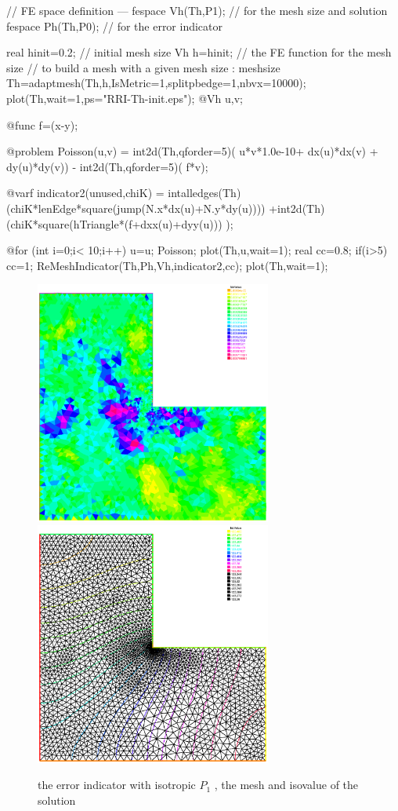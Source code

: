 \documentclass[a4paper,twoside,12pt]{book}
\begin{document}
\begin{example}
\bFF
// FE space definition ---
fespace Vh(Th,P1); // for the mesh size and solution
fespace Ph(Th,P0); // for the error  indicator

real hinit=0.2; //  initial mesh size
Vh   h=hinit; // the FE function  for the mesh size
// to build a mesh with a given mesh size  : meshsize
Th=adaptmesh(Th,h,IsMetric=1,splitpbedge=1,nbvx=10000);
plot(Th,wait=1,ps="RRI-Th-init.eps");
@Vh u,v;

@func f=(x-y);

@problem Poisson(u,v) =
    int2d(Th,qforder=5)( u*v*1.0e-10+  dx(u)*dx(v) + dy(u)*dy(v))
  - int2d(Th,qforder=5)( f*v);

 @varf indicator2(unused,chiK) =
     intalledges(Th)(chiK*lenEdge*square(jump(N.x*dx(u)+N.y*dy(u))))
    +int2d(Th)(chiK*square(hTriangle*(f+dxx(u)+dyy(u))) );

@for (int i=0;i< 10;i++)
{
	u=u;
	Poisson;
	plot(Th,u,wait=1);
	real cc=0.8;
	if(i>5) cc=1;
	ReMeshIndicator(Th,Ph,Vh,indicator2,cc);
	plot(Th,wait=1);
}
\eFF

\begin{figure}[hbt]
\begin{center}

\includegraphics[height=8cm]{arei-etak} \includegraphics[height=8cm]{arei-Thu}
\end{center}
\caption{\label{fig:arei-Thu}the error indicator  with isotropic $P_{1}$ ,  the mesh and isovalue of the solution  }
\end{figure}
\end{example}
\end{document}

